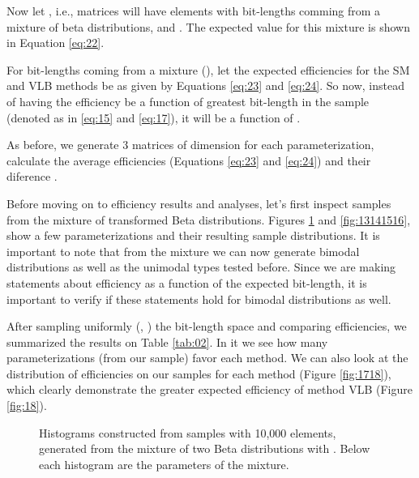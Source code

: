 \documentclass[10pt]{article}
\begin{document}
Now let , i.e., matrices will have elements with bit-lengths comming from a mixture of beta distributions,  and . The expected value for this mixture is shown in Equation \ref{eq:22}.
 

 
For bit-lengths coming from a mixture (), let the expected efficiencies for the SM and VLB methods be as given by Equations \ref{eq:23} and \ref{eq:24}. So now, instead of having the efficiency be a function of greatest bit-length in the sample (denoted as   in \ref{eq:15} and \ref{eq:17}), it will be a function of .




 
As before, we generate 3 matrices of dimension  for each parameterization, calculate the average efficiencies (Equations \ref{eq:23} and \ref{eq:24}) and their diference .

Before moving on to efficiency results and analyses, let's first inspect samples from the mixture of transformed Beta distributions. Figures \ref{fig:09101112} and \ref{fig:13141516}, show a few parameterizations and their resulting sample distributions. It is important to note that from the mixture we can now generate bimodal distributions as well as the unimodal types tested before. Since we are making statements about efficiency as a function of the expected bit-length, it is important to verify if these statements hold for bimodal  distributions as well.

After sampling uniformly (, ) the bit-length space and comparing efficiencies, we summarized the results on Table \ref{tab:02}. In it we see how many parameterizations (from our sample) favor each method. We can also look at the distribution of efficiencies on our samples for each method (Figure \ref{fig:1718}), which clearly demonstrate the greater expected efficiency of method VLB (Figure \ref{fig:18}).

\begin{figure}[h]
  \centering
  \caption{Histograms constructed from samples with 10,000 elements, generated from the mixture of two Beta distributions with . Below each histogram are the parameters of the mixture.}
  \label{fig:09101112}
\end{figure}
\end{document}
